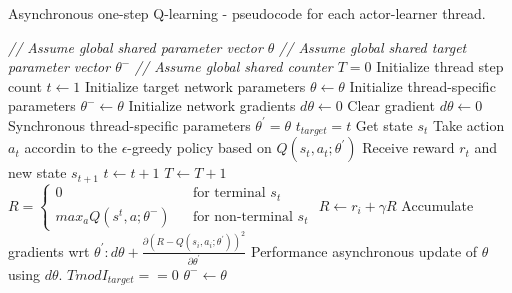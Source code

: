 \documentclass[12pt,a4paper]{article}
\begin{document}
\begin{algorithm} 
	\caption{Asynchronous one-step Q-learning - pseudocode for each actor-learner thread.}
	\label{asynchronous_n_step_q_learning}
	\begin{algorithmic}[1]
		\State \textit{// Assume global shared parameter vector $\theta$}
		\State \textit{// Assume global shared target parameter vector $\theta^{-}$}
		\State \textit{// Assume global shared counter $T = 0$}
		\State Initialize thread step count $t \leftarrow 1$
		\State Initialize target network parameters $\theta \leftarrow \theta$
		\State Initialize thread-specific parameters $\theta^{-} \leftarrow \theta$
		\State Initialize network gradients $d\theta \leftarrow 0$
		\Repeat 
			\State Clear gradient $d\theta \leftarrow 0$
			\State Synchronous thread-specific parameters $\theta^{'} = \theta$
			\State $t_{target} = t$
			\State Get state $s_{t}$
			\Repeat
				\State Take action $a_{t}$ accordin to the $\epsilon$-greedy policy based on $Q(s_{t}, a_{t};\theta^{'})$
				\State Receive reward $r_{t}$ and new state $s_{t+1}$
				\State $t \leftarrow t + 1$
				\State $T \leftarrow T + 1$
			\State $R = \left\lbrace
				\begin{array}{lcl}
					0 & & \text{for terminal }s_{t} \\
					max_{a}Q(s^{t}, a; \theta^{-}) & & \text{for non-terminal }s_{t}
				\end{array}	\right.$	
				\State $R \leftarrow r_{i} + \gamma R$
				\State Accumulate gradients wrt $\theta^{'} : d\theta + \frac{\partial(R - Q(s_{i},a_{i}; \theta^{'}))^{2}}{\partial{\theta^{'}}}$
			\EndFor	
			\State Performance asynchronous update of $\theta$ using $d\theta$.
			\If $T mod I_{target} == 0$
				\State $\theta^{-} \leftarrow \theta$
			\EndIf
		
	\end{algorithmic}
\end{algorithm}
\end{document}
